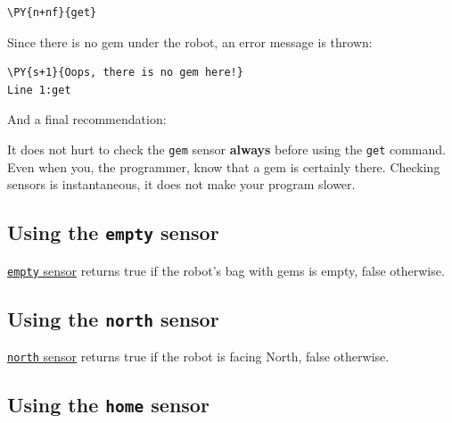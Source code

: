\begin{bbox}
\begin{Verbatim}[commandchars=\\\{\}]
\PY{n+nf}{get}
\end{Verbatim}
\end{bbox}
\vspace{6mm}

\noindent
Since there is no gem under the robot, an error message is thrown:\\

\begin{ybox}
\begin{Verbatim}[commandchars=\\\{\}]
\PY{s+1}{Oops, there is no gem here!}
Line 1:get
\end{Verbatim}
\end{ybox}
\vspace{6mm}

\noindent
And a final recommendation:\\

\begin{gbox}
\begin{center}
It does not hurt to check the {\tt gem} sensor {\bf always} before using the {\tt get}
command. Even when you, the programmer, know that a gem is certainly there. 
Checking sensors is instantaneous, it does not make your program slower.
\end{center}
\end{gbox}




\subsection{Using the {\tt empty} sensor}

\underline{{\tt empty} sensor} returns true if the robot's bag with gems is empty, false otherwise. \\

\subsection{Using the {\tt north} sensor}

\underline{{\tt north} sensor} returns true if the robot is facing North, false otherwise.\\

\subsection{Using the {\tt home} sensor}

